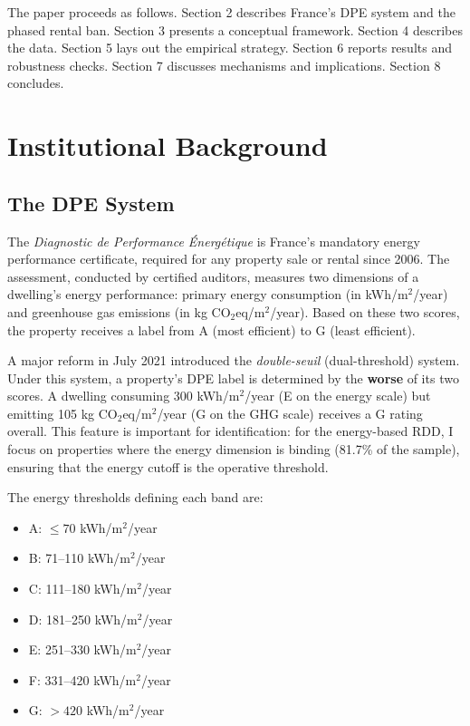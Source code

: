 \documentclass[12pt]{article}
\begin{document}
The paper proceeds as follows. Section 2 describes France's DPE system and the phased rental ban. Section 3 presents a conceptual framework. Section 4 describes the data. Section 5 lays out the empirical strategy. Section 6 reports results and robustness checks. Section 7 discusses mechanisms and implications. Section 8 concludes.


\section{Institutional Background}

\subsection{The DPE System}

The \textit{Diagnostic de Performance \'Energ\'etique} is France's mandatory energy performance certificate, required for any property sale or rental since 2006. The assessment, conducted by certified auditors, measures two dimensions of a dwelling's energy performance: primary energy consumption (in kWh/m$^2$/year) and greenhouse gas emissions (in kg CO$_2$eq/m$^2$/year). Based on these two scores, the property receives a label from A (most efficient) to G (least efficient).

A major reform in July 2021 introduced the \textit{double-seuil} (dual-threshold) system. Under this system, a property's DPE label is determined by the \textbf{worse} of its two scores. A dwelling consuming 300 kWh/m$^2$/year (E on the energy scale) but emitting 105 kg CO$_2$eq/m$^2$/year (G on the GHG scale) receives a G rating overall. This feature is important for identification: for the energy-based RDD, I focus on properties where the energy dimension is binding (81.7\% of the sample), ensuring that the energy cutoff is the operative threshold.

The energy thresholds defining each band are:
\begin{itemize}
    \item A: $\leq 70$ kWh/m$^2$/year
    \item B: 71--110 kWh/m$^2$/year
    \item C: 111--180 kWh/m$^2$/year
    \item D: 181--250 kWh/m$^2$/year
    \item E: 251--330 kWh/m$^2$/year
    \item F: 331--420 kWh/m$^2$/year
    \item G: $> 420$ kWh/m$^2$/year
\end{itemize}
\end{document}

